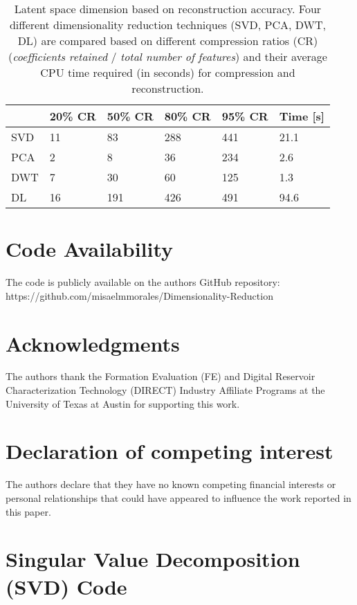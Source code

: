 \documentclass[a4paper,fleqn,12pt]{article}
\begin{document}
\begin{table}[H]
    \centering
    \begin{tabular}{|l|l|l|l|l|l|}
    \hline
        & 20\% CR & 50\% CR & 80\% CR & 95\% CR & Time [s]  \\
    \hline
    SVD & 11  & 83  & 288 & 441 & 21.1          \\
    PCA & 2   & 8   & 36  & 234 & 2.6           \\
    DWT & 7   & 30  & 60  & 125 & 1.3           \\
    DL  & 16  & 191 & 426 & 491 & 94.6          \\
    \hline
    \end{tabular}
    \caption{Latent space dimension based on reconstruction accuracy. Four different dimensionality reduction techniques (SVD, PCA, DWT, DL) are compared based on different compression ratios (CR) (\emph{coefficients retained} / \emph{total number of features}) and their average CPU time required (in seconds) for compression and reconstruction.}
    \label{tab:comparison}
\end{table}

\pagebreak
\section*{Code Availability}
The code is publicly available on the authors GitHub repository: \\ https://github.com/misaelmmorales/Dimensionality-Reduction

\section*{Acknowledgments}
The authors thank the Formation Evaluation (FE) and Digital Reservoir Characterization Technology (DIRECT) Industry Affiliate Programs at the University of Texas at Austin for supporting this work.

\section*{Declaration of competing interest}
The authors declare that they have no known competing financial interests or personal relationships that could have appeared to influence the work reported in this paper.

\pagebreak
\appendix
\renewcommand{\thesection}{Appendix \Alph{section}}

\section{Singular Value Decomposition (SVD) Code}\label{app:svd}
\inputminted[frame=lines, framesep=2mm, baselinestretch=1.2, 
             bgcolor=LightGray, fontsize=\footnotesize, linenos]
{python}{codes/svd.py}
\end{document}
